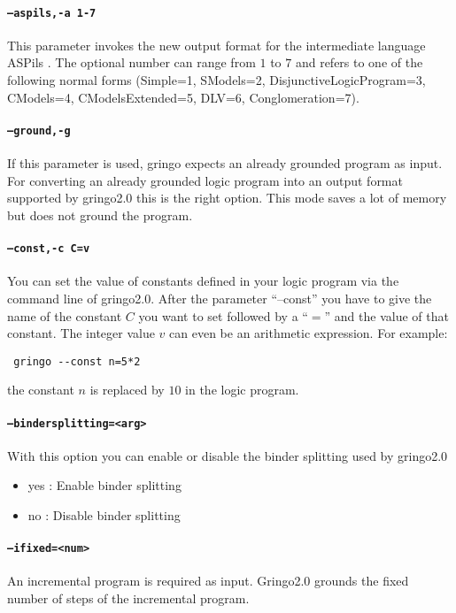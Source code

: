 \documentclass[a4paper,10pt]{article}
\begin{document}
\paragraph{\texttt{--aspils,-a 1-7}}
This parameter invokes the new output format for the intermediate language ASPils \cite{gejaosscth08b}. The optional number can range from $1$ to $7$ and refers to one of the following normal forms (Simple=1, SModels=2, DisjunctiveLogicProgram=3, CModels=4, CModelsExtended=5, DLV=6, Conglomeration=7).

\paragraph{\texttt{--ground,-g}}
If this parameter is used, gringo expects an already grounded program as input.
For converting an already grounded logic program into an output format 
supported by gringo2.0 this is the right option.
 This mode saves a lot of memory but does not ground the program.
\paragraph{\texttt{--const,-c C=v}}
You can set the value of constants defined in your logic program via the command line of gringo2.0.
After the parameter ``--const'' you have to give the name of the constant $C$ you want to set followed by a ``$=$'' and the value of that constant. The integer value $v$ can even be an arithmetic expression. For example:
\begin{verbatim}
 gringo --const n=5*2
\end{verbatim}
the constant $n$ is replaced by $10$ in the logic program.
\paragraph{\texttt{--bindersplitting=<arg>}}
With this option you can enable or disable the binder splitting used by gringo2.0
\begin{itemize}
 \item yes : Enable binder splitting
 \item no  : Disable binder splitting
\end{itemize}
\paragraph{\texttt{--ifixed=<num>}}
An incremental program is required as input. Gringo2.0 grounds the fixed number of steps of the incremental program.
\end{document}
